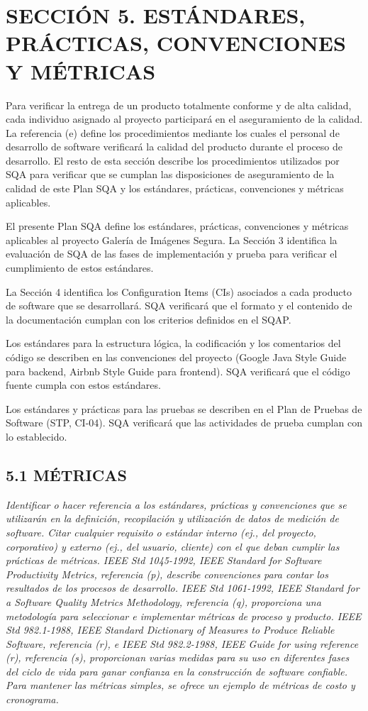 ﻿\section{SECCIÓN 5. ESTÁNDARES, PRÁCTICAS, CONVENCIONES Y MÉTRICAS}
Para verificar la entrega de un producto totalmente conforme y de alta calidad, cada individuo asignado al proyecto participará en el aseguramiento de la calidad. La referencia (e) define los procedimientos mediante los cuales el personal de desarrollo de software verificará la calidad del producto durante el proceso de desarrollo. El resto de esta sección describe los procedimientos utilizados por SQA para verificar que se cumplan las disposiciones de aseguramiento de la calidad de este Plan SQA y los estándares, prácticas, convenciones y métricas aplicables.

El presente Plan SQA define los estándares, prácticas, convenciones y métricas aplicables al proyecto Galería de Imágenes Segura. La Sección 3 identifica la evaluación de SQA de las fases de implementación y prueba para verificar el cumplimiento de estos estándares.

La Sección 4 identifica los Configuration Items (CIs) asociados a cada producto de software que se desarrollará. SQA verificará que el formato y el contenido de la documentación cumplan con los criterios definidos en el SQAP.

Los estándares para la estructura lógica, la codificación y los comentarios del código se describen en las convenciones del proyecto (Google Java Style Guide para backend, Airbnb Style Guide para frontend). SQA verificará que el código fuente cumpla con estos estándares.

Los estándares y prácticas para las pruebas se describen en el Plan de Pruebas de Software (STP, CI-04). SQA verificará que las actividades de prueba cumplan con lo establecido.

\subsection{5.1 MÉTRICAS}
\textit{Identificar o hacer referencia a los estándares, prácticas y convenciones que se utilizarán en la definición, recopilación y utilización de datos de medición de software. Citar cualquier requisito o estándar interno (ej., del proyecto, corporativo) y externo (ej., del usuario, cliente) con el que deban cumplir las prácticas de métricas. IEEE Std 1045-1992, IEEE Standard for Software Productivity Metrics, referencia (p), describe convenciones para contar los resultados de los procesos de desarrollo. IEEE Std 1061-1992, IEEE Standard for a Software Quality Metrics Methodology, referencia (q), proporciona una metodología para seleccionar e implementar métricas de proceso y producto. IEEE Std 982.1-1988, IEEE Standard Dictionary of Measures to Produce Reliable Software, referencia (r), e IEEE Std 982.2-1988, IEEE Guide for using reference (r), referencia (s), proporcionan varias medidas para su uso en diferentes fases del ciclo de vida para ganar confianza en la construcción de software confiable. Para mantener las métricas simples, se ofrece un ejemplo de métricas de costo y cronograma.}

